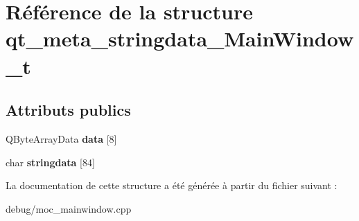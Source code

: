 \hypertarget{structqt__meta__stringdata___main_window__t}{}\section{Référence de la structure qt\+\_\+meta\+\_\+stringdata\+\_\+\+Main\+Window\+\_\+t}
\label{structqt__meta__stringdata___main_window__t}
\subsection*{Attributs publics}
\begin{DoxyCompactItemize}
\item 
\mbox{\label{structqt__meta__stringdata___main_window__t_ae8888f3a82b4bd7597ba5dad592aeec6}} 
Q\+Byte\+Array\+Data {\bfseries data} \mbox{[}8\mbox{]}
\item 
\mbox{\label{structqt__meta__stringdata___main_window__t_aa254c6a1d5e117ff0ad099be036eb26b}} 
char {\bfseries stringdata} \mbox{[}84\mbox{]}
\end{DoxyCompactItemize}


La documentation de cette structure a été générée à partir du fichier suivant \+:\begin{DoxyCompactItemize}
\item 
debug/moc\+\_\+mainwindow.\+cpp\end{DoxyCompactItemize}
